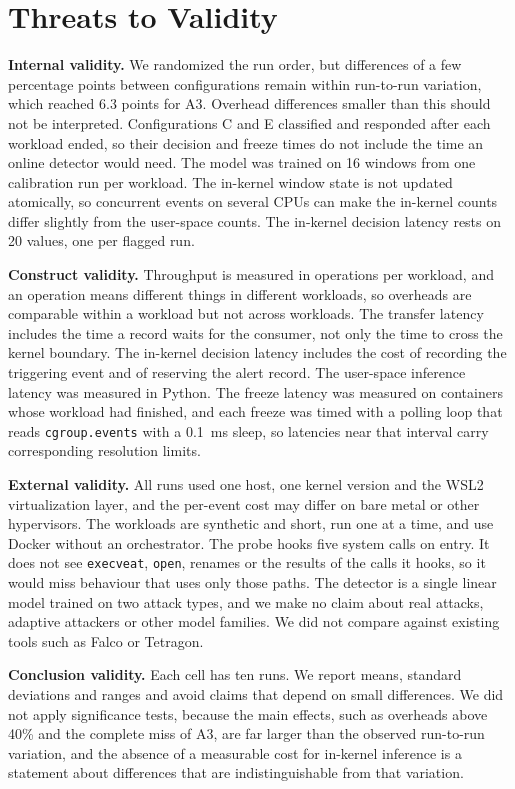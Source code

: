 \section{Threats to Validity}
\label{sec:threats}

\textbf{Internal validity.} We randomized the run order, but differences of a few percentage points between configurations remain within run-to-run variation, which reached 6.3 points for A3. Overhead differences smaller than this should not be interpreted. Configurations C and E classified and responded after each workload ended, so their decision and freeze times do not include the time an online detector would need. The model was trained on 16 windows from one calibration run per workload. The in-kernel window state is not updated atomically, so concurrent events on several CPUs can make the in-kernel counts differ slightly from the user-space counts. The in-kernel decision latency rests on 20 values, one per flagged run.

\textbf{Construct validity.} Throughput is measured in operations per workload, and an operation means different things in different workloads, so overheads are comparable within a workload but not across workloads. The transfer latency includes the time a record waits for the consumer, not only the time to cross the kernel boundary. The in-kernel decision latency includes the cost of recording the triggering event and of reserving the alert record. The user-space inference latency was measured in Python. The freeze latency was measured on containers whose workload had finished, and each freeze was timed with a polling loop that reads \texttt{cgroup.events} with a 0.1~ms sleep, so latencies near that interval carry corresponding resolution limits.

\textbf{External validity.} All runs used one host, one kernel version and the WSL2 virtualization layer, and the per-event cost may differ on bare metal or other hypervisors. The workloads are synthetic and short, run one at a time, and use Docker without an orchestrator. The probe hooks five system calls on entry. It does not see \texttt{execveat}, \texttt{open}, renames or the results of the calls it hooks, so it would miss behaviour that uses only those paths. The detector is a single linear model trained on two attack types, and we make no claim about real attacks, adaptive attackers or other model families. We did not compare against existing tools such as Falco or Tetragon.

\textbf{Conclusion validity.} Each cell has ten runs. We report means, standard deviations and ranges and avoid claims that depend on small differences. We did not apply significance tests, because the main effects, such as overheads above 40\% and the complete miss of A3, are far larger than the observed run-to-run variation, and the absence of a measurable cost for in-kernel inference is a statement about differences that are indistinguishable from that variation.

